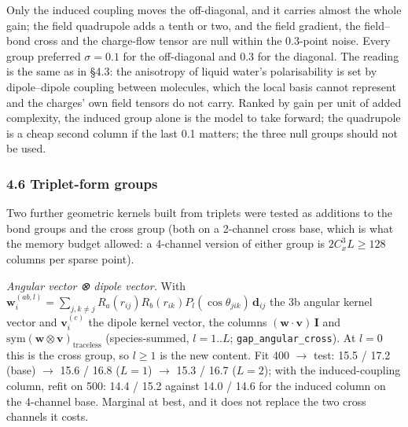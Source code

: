 \documentclass[
  10pt,
]{article}
\begin{document}
Only the induced coupling moves the off-diagonal, and it carries almost the whole gain; the field
quadrupole adds a tenth or two, and the field gradient, the field--bond cross and the charge-flow
tensor are null within the 0.3-point noise. Every group preferred \(\sigma=0.1\) for the
off-diagonal and \(0.3\) for the diagonal. The reading is the same as in §4.3: the anisotropy of
liquid water's polarisability is set by dipole--dipole coupling between molecules, which the local
basis cannot represent and the charges' own field tensors do not carry. Ranked by gain per unit of
added complexity, the induced group alone is the model to take forward; the quadrupole is a cheap
second column if the last 0.1 matters; the three null groups should not be used.

\subsubsection{4.6 Triplet-form groups}\label{triplet-form-groups}

Two further geometric kernels built from triplets were tested as additions to the bond groups and
the cross group (both on a 2-channel cross base, which is what the memory budget allowed: a
4-channel version of either group is \(2C_x^3L\ge128\) columns per sparse point).

\emph{Angular vector ⊗ dipole vector.} With
\(\mathbf w^{(ab,l)}_i=\sum_{j,k\ne j}R_a(r_{ij})R_b(r_{ik})P_l(\cos\theta_{jik})\,\mathbf d_{ij}\)
the 3b angular kernel vector and \(\mathbf v^{(c)}_i\) the dipole kernel vector, the columns
\((\mathbf w\cdot\mathbf v)\,\mathbf I\) and
\(\mathrm{sym}(\mathbf w\otimes\mathbf v)_{\text{traceless}}\) (species-summed, \(l=1..L\);
\texttt{gap\_angular\_cross}). At \(l=0\) this is the cross group, so \(l\ge1\) is the new content.
Fit 400 \(\rightarrow\) test: 15.5 / 17.2 (base) \(\rightarrow\) 15.6 / 16.8 (\(L=1\))
\(\rightarrow\) 15.3 / 16.7 (\(L=2\)); with the induced-coupling column, refit on 500: 14.4 / 15.2
against 14.0 / 14.6 for the induced column on the 4-channel base. Marginal at best, and it does not
replace the two cross channels it costs.
\end{document}
